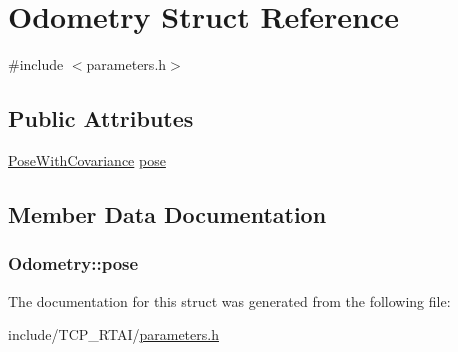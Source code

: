 \hypertarget{structOdometry}{
\section{Odometry Struct Reference}
\label{structOdometry}
}


{\ttfamily \#include $<$parameters.h$>$}

\subsection*{Public Attributes}
\begin{DoxyCompactItemize}
\item 
\hyperlink{structPoseWithCovariance}{PoseWithCovariance} \hyperlink{structOdometry_a2272d53989037e95d0a151daaf157e3a}{pose}
\end{DoxyCompactItemize}


\subsection{Member Data Documentation}
\hypertarget{structOdometry_a2272d53989037e95d0a151daaf157e3a}{
\subsubsection[{pose}]{ {\bf Odometry::pose}}}
\label{structOdometry_a2272d53989037e95d0a151daaf157e3a}


The documentation for this struct was generated from the following file:\begin{DoxyCompactItemize}
\item 
include/TCP\_\-RTAI/\hyperlink{include_2TCP__RTAI_2parameters_8h}{parameters.h}\end{DoxyCompactItemize}
